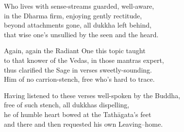 \begin{MyDescription}{}
Who lives with sense-streams guarded, well-aware,\\
in the Dharma ﬁrm, enjoying gently rectitude,\\
beyond attachments gone, all dukkha left behind,\\
that wise one's unsullied by the seen and the heard.
\end{MyDescription}    

\begin{MyDescription}{}
Again, again the Radiant One this topic taught\\
to that knower of the Vedas, in those mantras expert,\\
thus clariﬁed the Sage in verses sweetly-sounding.\\
Him of no carrion-stench, free who's hard to trace.
\end{MyDescription}  

\begin{MyDescription}{}
Having listened to these verses well-spoken by the Buddha,\\
free of such stench, all dukkhas dispelling,\\
he of humble heart bowed at the Tath\=agata's feet\\
and there and then requested his own Leaving--home.
\end{MyDescription}     
   
\begin{MyDescription}[(Sn. 239-252)]{}
\end{MyDescription}
\newpage
